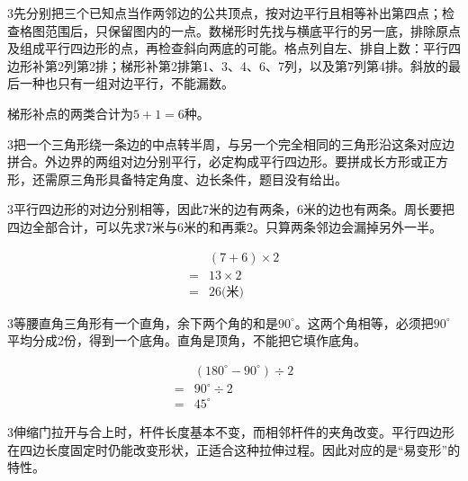 \documentclass[multi=snippet,border={5bp 20bp 5bp 5bp}]{standalone}
\newenvironment{snippet}[3]{\begin{minipage}{#1bp}\color{answerred}\fontsize{#2}{#3}\selectfont\raggedright}{\end{minipage}}
\begin{document}
\begin{snippet}{505}{11.5}{14}\begin{multicols}{3}\raggedcolumns 先分别把三个已知点当作两邻边的公共顶点，按对边平行且相等补出第四点；检查格图范围后，只保留图内的一点。数梯形时先找与横底平行的另一底，排除原点及组成平行四边形的点，再检查斜向两底的可能。格点列自左、排自上数：平行四边形补第2列第2排；梯形补第2排第1、3、4、6、7列，以及第7列第4排。斜放的最后一种也只有一组对边平行，不能漏数。\par 梯形补点的两类合计为\(5+1=6\)\allowbreak 种。\end{multicols}\end{snippet}
\begin{snippet}{505}{11.5}{14}\begin{multicols}{3}\raggedcolumns 把一个三角形绕一条边的中点转半周，与另一个完全相同的三角形沿这条对应边拼合。外边界的两组对边分别平行，必定构成平行四边形。要拼成长方形或正方形，还需原三角形具备特定角度、边长条件，题目没有给出。\end{multicols}\end{snippet}
\begin{snippet}{505}{11.5}{14}\begin{multicols}{3}\raggedcolumns 平行四边形的对边分别相等，因此7米的边有两条，6米的边也有两条。周长要把四边全部合计，可以先求7米与6米的和再乘2。只算两条邻边会漏掉另外一半。\par \[\begin{aligned}&(7+6)\times2\\={}&13\times2\\={}&26\text{(米)}\end{aligned}\]\end{multicols}\end{snippet}
\begin{snippet}{505}{11.5}{14}\begin{multicols}{3}\raggedcolumns 等腰直角三角形有一个直角，余下两个角的和是\(90^\circ\)\allowbreak 。这两个角相等，必须把\(90^\circ\)\allowbreak 平均分成2份，得到一个底角。直角是顶角，不能把它填作底角。\par \[\begin{aligned}&(180^\circ-90^\circ)\div2\\={}&90^\circ\div2\\={}&45^\circ\end{aligned}\]\end{multicols}\end{snippet}
\begin{snippet}{505}{11.5}{14}\begin{multicols}{3}\raggedcolumns 伸缩门拉开与合上时，杆件长度基本不变，而相邻杆件的夹角改变。平行四边形在四边长度固定时仍能改变形状，正适合这种拉伸过程。因此对应的是“易变形”的特性。\end{multicols}\end{snippet}
\end{document}
